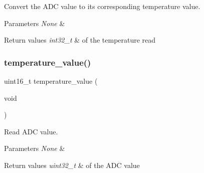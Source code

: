 Convert the A\+DC value to its corresponding temperature value. 


\begin{DoxyParams}{Parameters}
{\em None} & \\
\hline
\end{DoxyParams}

\begin{DoxyRetVals}{Return values}
{\em int32\+\_\+t} & of the temperature read \\
\hline
\end{DoxyRetVals}
\mbox{\label{group___temperature___data_ga74915aedf88ee7840a64ab372d768ca1}} 
\subsubsection{\texorpdfstring{temperature\+\_\+value()}{temperature\_value()}}
{\footnotesize\ttfamily uint16\+\_\+t temperature\+\_\+value (\begin{DoxyParamCaption}\item[{void}]{ }\end{DoxyParamCaption})}



Read A\+DC value. 


\begin{DoxyParams}{Parameters}
{\em None} & \\
\hline
\end{DoxyParams}

\begin{DoxyRetVals}{Return values}
{\em uint32\+\_\+t} & of the A\+DC value \\
\hline
\end{DoxyRetVals}
